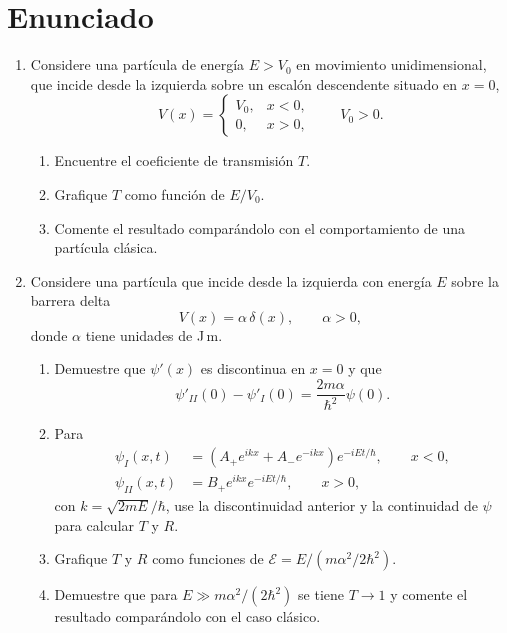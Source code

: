 \documentclass[11pt,a4paper]{article}
\numberwithin{equation}{section}
\begin{document}
\section*{Enunciado}
\begin{enumerate}[label=\arabic*.-]
\item Considere una partícula de energía $E>V_0$ en movimiento unidimensional, que incide desde la izquierda sobre un escalón descendente situado en $x=0$,
\begin{equation}
V(x)=\begin{cases}V_0,&x<0,\\0,&x>0,\end{cases}
\qquad V_0>0.
\end{equation}
\begin{enumerate}[label=\alph*)]
\item Encuentre el coeficiente de transmisión $T$.
\item Grafique $T$ como función de $E/V_0$.
\item Comente el resultado comparándolo con el comportamiento de una partícula clásica.
\end{enumerate}

\item Considere una partícula que incide desde la izquierda con energía $E$ sobre la barrera delta
\begin{equation}
V(x)=\alpha\,\delta(x),\qquad \alpha>0,
\end{equation}
donde $\alpha$ tiene unidades de J\,m.
\begin{enumerate}[label=\alph*)]
\item Demuestre que $\psi'(x)$ es discontinua en $x=0$ y que
\begin{equation}
\psi'_{II}(0)-\psi'_I(0)=\frac{2m\alpha}{\hbar^2}\psi(0).
\end{equation}
\item Para
\begin{align}
\psi_I(x,t)&=\left(A_+e^{ikx}+A_-e^{-ikx}\right)e^{-iEt/\hbar},\qquad x<0,\\
\psi_{II}(x,t)&=B_+e^{ikx}e^{-iEt/\hbar},\qquad x>0,
\end{align}
con $k=\sqrt{2mE}/\hbar$, use la discontinuidad anterior y la continuidad de $\psi$ para calcular $T$ y $R$.
\item Grafique $T$ y $R$ como funciones de $\mathcal E=E/(m\alpha^2/2\hbar^2)$.
\item Demuestre que para $E\gg m\alpha^2/(2\hbar^2)$ se tiene $T\to1$ y comente el resultado comparándolo con el caso clásico.
\end{enumerate}


\end{enumerate}
\end{document}
